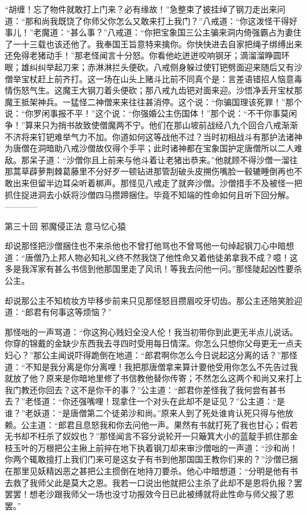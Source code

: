 \documentclass[12pt,UTF8]{ctexbook}
\begin{document}
“胡缠！忘了物件就敢打上门来？必有缘故！”急整束了披挂绰了钢刀走出来问道：“那和尚我既饶了你师父你怎么又敢来打上我门？”八戒道：“你这泼怪干得好事儿！”老魔道：“甚么事？”八戒道：“你把宝象国三公主骗来洞内倚强霸占为妻住了一十三载也该还他了。我奉国王旨意特来擒你。你快快进去自家把绳子绑缚出来还免得老猪动手！”那老怪闻言十分怒。你看他屹迸迸咬响钢牙；滴溜溜睁圆环眼；雄纠纠举起刀来；赤淋淋拦头便砍。八戒侧身躲过使钉钯劈面迎来随后又有沙僧举宝杖赶上前齐打。这一场在山头上赌斗比前不同真个是：言差语错招人恼意毒情伤怒气生。这魔王大钢刀着头便砍；那八戒九齿钯对面来迎。沙悟净丢开宝杖那魔王抵架神兵。一猛怪二神僧来来往往甚消停。这个说：“你骗国理该死罪！”那个说：“你罗闲事报不平！”这个说：“你强婚公主伤国体！”那个说：“不干你事莫闲争！”算来只为捎书故致使僧魔两不宁。他们在那山坡前战经八九个回合八戒渐渐不济将来钉钯难举气力不加。你道如何这等战他不过？当时初相战斗有那护法诸神为唐僧在洞暗助八戒沙僧故仅得个手平；此时诸神都在宝象国护定唐僧所以二人难敌。那呆子道：“沙僧你且上前来与他斗着让老猪出恭来。”他就顾不得沙僧一溜往那蒿草薜萝荆棘葛藤里不分好歹一顿钻进那管刮破头皮搠伤嘴脸一毂辘睡倒再也不敢出来但留半边耳朵听着梆声。那怪见八戒走了就奔沙僧。沙僧措手不及被怪一把抓住捉进洞去小妖将沙僧四马攒蹄捆住。毕竟不知端的性命如何且听下回分解。
------------

第三十回 邪魔侵正法 意马忆心猿

却说那怪把沙僧捆住也不来杀他也不曾打他骂也不曾骂他一句绰起钢刀心中暗想道：“唐僧乃上邦人物必知礼义终不然我饶了他性命又着他徒弟拿我不成？噫！这多是我浑家有甚么书信到他那国里走了风讯！等我去问他一问。”那怪陡起凶性要杀公主。

却说那公主不知梳妆方毕移步前来只见那怪怒目攒眉咬牙切齿。那公主还陪笑脸迎道：“郎君有何事这等烦恼？”

那怪咄的一声骂道：“你这狗心贱妇全没人伦！我当初带你到此更无半点儿说话。你穿的锦戴的金缺少东西我去寻四时受用每日情深。你怎么只想你父母更无一点夫妇心？”那公主闻说吓得跪倒在地道：“郎君啊你怎么今日说起这分离的话？”那怪道：“不知是我分离是你分离哩！我把那唐僧拿来算计要他受用你怎么不先告过我就放了他？原来是你暗地里修了书信教他替你传寄；不然怎么这两个和尚又来打上我门教还你回去？这不是你干的事？”公主道：“郎君你差怪我了我何尝有甚书去？”老怪道：“你还强嘴哩！现拿住一个对头在此却不是证见？”公主道：“是谁？”老妖道：“是唐僧第二个徒弟沙和尚。”原来人到了死处谁肯认死只得与他放赖。公主道：“郎君且息怒我和你去问他一声。果然有书就打死了我也甘心；假若无书却不枉杀了奴奴也？”那怪闻言不容分说轮开一只簸箕大小的蓝靛手抓住那金枝玉叶的万根把公主揪上前捽在地下执着钢刀却来审沙僧咄的一声道：“沙和尚！你两个辄敢擅打上我们门来可是这女子有书到他那国国王教你们来的？”沙僧已捆在那里见妖精凶恶之甚把公主掼倒在地持刀要杀。他心中暗想道：“分明是他有书去救了我师父此是莫大之恩。我若一口说出他就把公主杀了此却不是恩将仇报？罢罢罢！想老沙跟我师父一场也没寸功报效今日已此被缚就将此性命与师父报了恩罢。”
\end{document}
